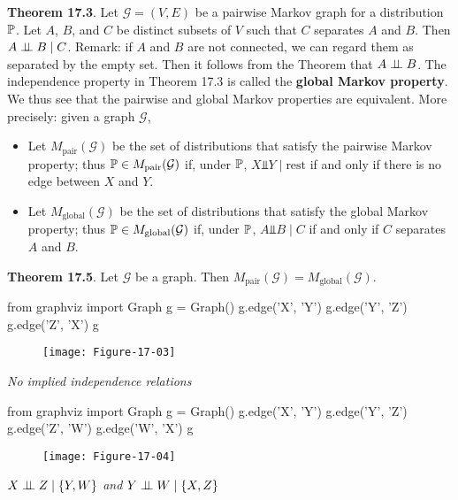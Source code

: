 \textbf{Theorem 17.3}. Let \(\mathcal{G} = (V, E)\) be a pairwise Markov
graph for a distribution \(\operatorname{\mathbb{P}}\). Let \(A\), \(B\), and \(C\) be
distinct subsets of \(V\) such that \(C\) separates \(A\) and \(B\).
Then \(A \perp\!\!\!\perp B \;|\; C\).
Remark: if \(A\) and \(B\) are not connected, we can regard them as
separated by the empty set. Then it follows from the Theorem that
\(A \perp\!\!\!\perp B\).
The independence property in Theorem 17.3 is called the \textbf{global
Markov property}. We thus see that the pairwise and global Markov
properties are equivalent.
More precisely: given a graph \(\mathcal{G}\),
\begin{itemize}[tightlist]
\item
  Let \(M_\text{pair}(\mathcal{G})\) be the set of distributions that
  satisfy the pairwise Markov property; thus
  \(\operatorname{\mathbb{P}} \in M_\text{pair}(\mathcal{G})\) if, under
  \(\operatorname{\mathbb{P}}\), \(X \text{⫫} Y \;|\; \text{rest}\) if and only if
  there is no edge between \(X\) and \(Y\).
\item
  Let \(M_\text{global}(\mathcal{G})\) be the set of distributions that
  satisfy the global Markov property; thus
  \(\operatorname{\mathbb{P}} \in M_\text{global}(\mathcal{G})\) if, under
  \(\operatorname{\mathbb{P}}\), \(A \text{⫫} B \;|\; C\) if and only if \(C\)
  separates \(A\) and \(B\).
\end{itemize}

\textbf{Theorem 17.5}. Let \(\mathcal{G}\) be a graph. Then
\(M_\text{pair}(\mathcal{G}) = M_\text{global}(\mathcal{G})\).

\begin{python}
from graphviz import Graph
g = Graph()
g.edge('X', 'Y')
g.edge('Y', 'Z')
g.edge('Z', 'X')
g
\end{python}

\begin{figure}[H]
\centering
\texttt{[image: Figure-17-03]}
\end{figure}

\emph{No implied independence relations}

\begin{python}
from graphviz import Graph
g = Graph()
g.edge('X', 'Y')
g.edge('Y', 'Z')
g.edge('Z', 'W')
g.edge('W', 'X')
g
\end{python}

\begin{figure}[H]
\centering
\texttt{[image: Figure-17-04]}
\end{figure}

\emph{\(X \perp\!\!\!\perp Z \;|\; \{Y, W\}\) and
\(Y \perp\!\!\!\perp W \;|\; \{X, Z\}\)}

